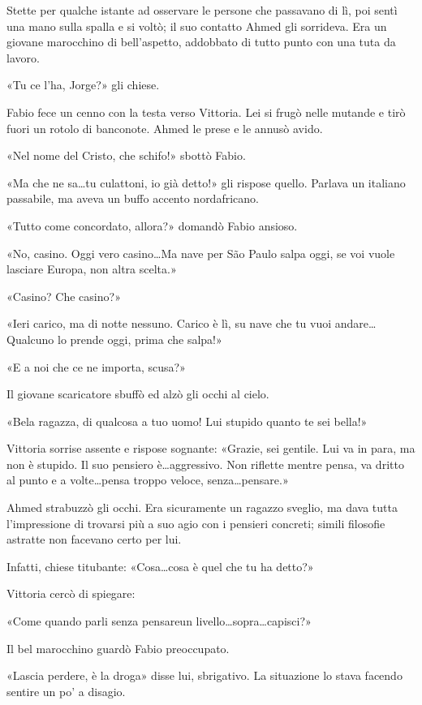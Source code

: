 Stette per qualche istante ad osservare le persone che passavano di lì, poi sentì una mano sulla spalla e si voltò; il suo contatto Ahmed gli sorrideva. Era un giovane marocchino di bell'aspetto, addobbato di tutto punto con una tuta da lavoro.

«Tu ce l'ha, Jorge?» gli chiese.

Fabio fece un cenno con la testa verso Vittoria. Lei si frugò nelle mutande e tirò fuori un rotolo di banconote. Ahmed le prese e le annusò avido.

«Nel nome del Cristo, che schifo!» sbottò Fabio.

«Ma che ne sa\ldots tu culattoni, io già detto!» gli rispose quello. Parlava un italiano passabile, ma aveva un buffo accento nordafricano.

«Tutto come concordato, allora?» domandò Fabio ansioso.

«No, casino. Oggi vero casino\ldots Ma nave per São Paulo salpa oggi, se voi vuole lasciare Europa, non altra scelta.»

«Casino? Che casino?»

«Ieri carico, ma di notte nessuno. Carico è lì, su nave che tu vuoi andare\ldots Qualcuno lo prende oggi, prima che salpa!»

«E a noi che ce ne importa, scusa?»

Il giovane scaricatore sbuffò ed alzò gli occhi al cielo.

«Bela ragazza, di qualcosa a tuo uomo! Lui stupido quanto te sei bella!»

Vittoria sorrise assente e rispose sognante: «Grazie, sei gentile. Lui va in para, ma non è stupido. Il suo pensiero è\ldots aggressivo. Non riflette mentre pensa, va dritto al punto e a volte\ldots pensa troppo veloce, senza\ldots pensare.»

Ahmed strabuzzò gli occhi. Era sicuramente un ragazzo sveglio, ma dava tutta l'impressione di trovarsi più a suo agio con i pensieri concreti; simili filosofie astratte non facevano certo per lui.

Infatti, chiese titubante: «Cosa\ldots cosa è quel che tu ha detto?»

Vittoria cercò di spiegare:

«Come quando parli senza pensare\ldotsma un livello\ldots sopra\ldots capisci?»

Il bel marocchino guardò Fabio preoccupato.

«Lascia perdere, è la droga» disse lui, sbrigativo. La situazione lo stava facendo sentire un po' a disagio.

